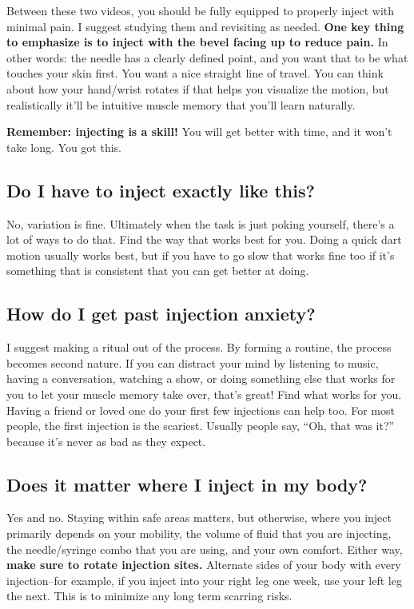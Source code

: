 \documentclass{article}
\begin{document}
Between these two videos, you should be fully equipped to properly inject with minimal pain. I suggest studying them and revisiting as needed. \textbf{One key thing to emphasize is to inject with the bevel facing up to reduce pain.} In other words: the needle has a clearly defined point, and you want that to be what touches your skin first. You want a nice straight line of travel. You can think about how your hand/wrist rotates if that helps you visualize the motion, but realistically it'll be intuitive muscle memory that you'll learn naturally.

\textbf{Remember: injecting is a skill!} You will get better with time, and it won’t take long. You got this.

\subsection{Do I have to inject exactly like this?}

No, variation is fine. Ultimately when the task is just poking yourself, there’s a lot of ways to do that. Find the way that works best for you. Doing a quick dart motion usually works best, but if you have to go slow that works fine too if it’s something that is consistent that you can get better at doing.

\subsection{How do I get past injection anxiety?}

I suggest making a ritual out of the process. By forming a routine, the process becomes second nature. If you can distract your mind by listening to music, having a conversation, watching a show, or doing something else that works for you to let your muscle memory take over, that’s great! Find what works for you. Having a friend or loved one do your first few injections can help too. For most people, the first injection is the scariest. Usually people say, “Oh, that was it?” because it’s never as bad as they expect.

\subsection{Does it matter where I inject in my body?}

Yes and no. Staying within safe areas matters, but otherwise, where you inject primarily depends on your mobility, the volume of fluid that you are injecting, the needle/syringe combo that you are using, and your own comfort. Either way, \textbf{make sure to rotate injection sites.} Alternate sides of your body with every injection–for example, if you inject into your right leg one week, use your left leg the next. This is to minimize any long term scarring risks.
\end{document}
